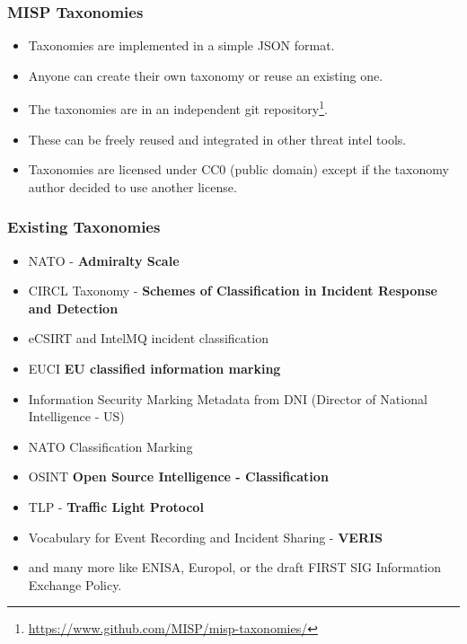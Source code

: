 \begin{frame}
\frametitle{MISP Taxonomies}
\begin{itemize}
\item Taxonomies are implemented in a simple JSON format.
\item Anyone can create their own taxonomy or reuse an existing one.
\item The taxonomies are in an independent git repository\footnote{\url{https://www.github.com/MISP/misp-taxonomies/}}.
\item These can be freely reused and integrated in other threat intel tools.
\item Taxonomies are licensed under CC0 (public domain) except if the taxonomy author decided to use another license.
\end{itemize}
\end{frame}

\begin{frame}
\frametitle{Existing Taxonomies}
\begin{itemize}
\item NATO - {\bf Admiralty Scale}
\item CIRCL Taxonomy - {\bf Schemes of Classification in Incident Response and Detection}
\item eCSIRT and IntelMQ incident classification
\item EUCI {\bf EU classified information marking}
\item Information Security Marking Metadata from DNI (Director of National Intelligence - US)
\item NATO Classification Marking
\item OSINT {\bf Open Source Intelligence - Classification}
\item TLP - {\bf Traffic Light Protocol}
\item Vocabulary for Event Recording and Incident Sharing - {\bf VERIS}
\item and many more like ENISA, Europol, or the draft FIRST SIG Information Exchange Policy.
\end{itemize}
\end{frame}


